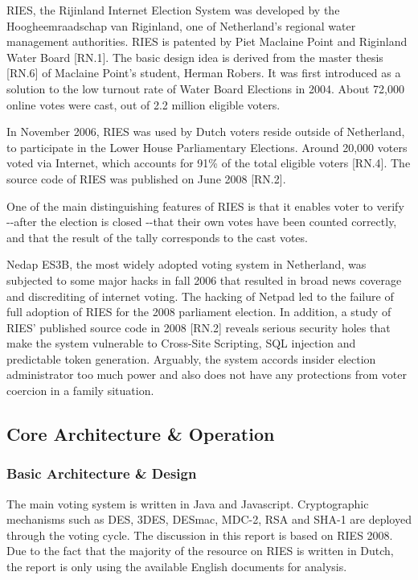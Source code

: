 RIES, the Rijinland Internet Election System was developed by the Hoogheemraadschap van Riginland, one of Netherland's regional water management authorities. RIES is patented by Piet Maclaine Point and Riginland Water Board [RN.1]. The basic design idea is derived from the master thesis [RN.6] of Maclaine Point's student, Herman Robers. It was first introduced as a solution to the low turnout rate of Water Board Elections in 2004. About 72,000 online votes were cast, out of 2.2 million eligible voters.

In November 2006, RIES was used by Dutch voters reside outside of Netherland, to participate in the Lower House Parliamentary Elections. Around 20,000 voters voted via Internet, which accounts for 91\% of the total eligible voters [RN.4]. The source code of RIES was published on June 2008 [RN.2].

One of the main distinguishing features of RIES is that it enables voter to verify -{}-after the election is closed -{}-that their own votes have been counted correctly, and that the result of the tally corresponds to the cast votes.

Nedap ES3B, the most widely adopted voting system in Netherland, was subjected to some major hacks in fall 2006 that resulted in broad news coverage and discrediting of internet voting. The hacking of Netpad led to the failure of full adoption of RIES for the 2008 parliament election. In addition, a study of RIES' published source code in 2008 [RN.2] reveals serious security holes that make the system vulnerable to Cross-Site Scripting, SQL injection and predictable token generation. Arguably, the system accords insider election administrator too much power and also does not have any protections from voter coercion in a family situation.

\subsection{Core Architecture \& Operation}

\subsubsection{Basic Architecture \& Design}

The main voting system is written in Java and Javascript. Cryptographic mechanisms such as DES, 3DES, DESmac, MDC-2, RSA and SHA-1 are deployed through the voting cycle. The discussion in this report is based on RIES 2008. Due to the fact that the majority of the resource on RIES is written in Dutch, the report is only using the available English documents for analysis.

